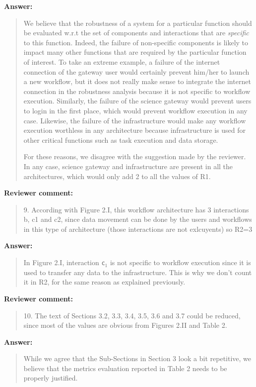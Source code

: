 \documentclass[a4]{article}
\newenvironment{review}%
{\textbf{Reviewer comment:}\begin{quote}}%
{\end{quote}}%
\newenvironment{answer}%
{\textbf{Answer:}\begin{small}\begin{quote}}%
{\end{quote}\end{small}}%
\begin{document}
\begin{answer}
  We believe that the robustness of a system for a particular function
  should be evaluated w.r.t the set of components and interactions
  that are \emph{specific} to this function. Indeed, the failure of
  non-specific components is likely to impact many other functions
  that are required by the particular function of interest. To take an
  extreme example, a failure of the internet connection of the gateway
  user would certainly prevent him/her to launch a new workflow, but
  it does not really make sense to integrate the internet connection
  in the robustness analysis because it is not specific to workflow
  execution. Similarly, the failure of the science gateway would
  prevent users to login in the first place, which would prevent
  workflow execution in any case. Likewise, the failure of the
  infrastructure would make any workflow execution worthless in any
  architecture because infrastructure is used for other critical
  functions such as task execution and data storage.

  For these reasons, we disagree with the suggestion made by the
  reviewer. In any case, science gateway and infrastructure are
  present in all the architectures, which would only add 2 to all the
  values of R1.
\end{answer}

\begin{review}
9. According with Figure 2.I, this workflow architecture has 3
interactions b, c1 and c2, since data movement can be done by the
users and workflows in this type of architecture (those interactions
are not exlcuyents) so R2=3
\end{review}

\begin{answer}
  In Figure 2.I, interaction \texttt{c$_1$} is not specific to
  workflow execution since it is used to transfer any data to the
  infrastructure. This is why we don't count it in R2, for the same
  reason as explained previously.
\end{answer}

\begin{review}
  10. The text of Sections 3.2, 3.3, 3.4, 3.5, 3.6 and 3.7 could be
  reduced, since most of the values are obvious from Figures 2.II and
  Table 2.
\end{review}

\begin{answer}
  While we agree that the Sub-Sections in Section 3 look a bit
  repetitive, we believe that the metrics evaluation reported in Table 2 needs to be
  properly justified. 
\end{answer}
\end{document}
